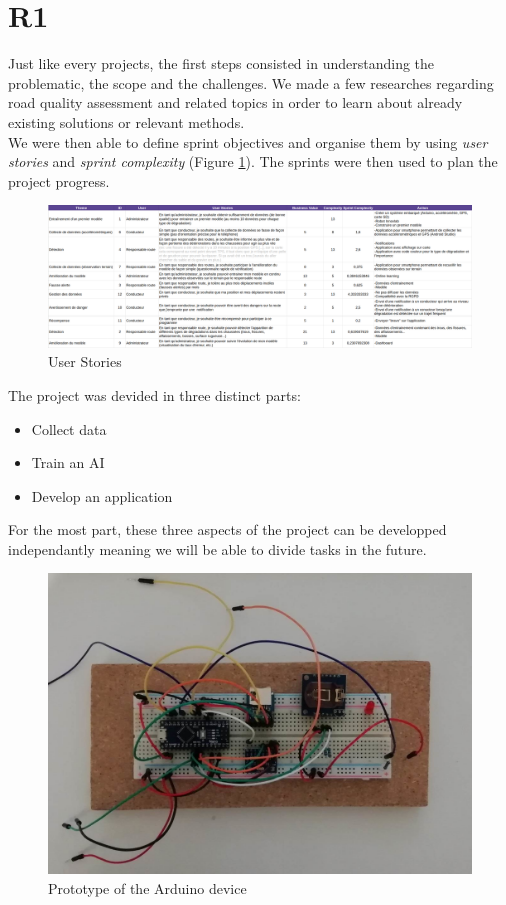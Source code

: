 \section{R1}
Just like every projects, the first steps consisted in understanding the problematic, the scope and the challenges. We made a few researches regarding road quality assessment and related topics in order to learn about already existing solutions or relevant methods.\\

We were then able to define sprint objectives and organise them by using \textit{user stories} and \textit{sprint complexity} (Figure \ref{user_stories}). The sprints were then used to plan the project progress.

\begin{figure}
    \center
    \includegraphics[scale=.2]{img/user_stories.png}
    \caption{User Stories}
    \label{user_stories}
\end{figure}

The project was devided in three distinct parts:
\begin{itemize}
\item Collect data
\item Train an AI
\item Develop an application
\end{itemize}
For the most part, these three aspects of the project can be developped independantly meaning we will be able to divide tasks in the future.\\

\begin{figure}
    \center
    \includegraphics[scale=.8]{img/breadboard.png}
    \caption{Prototype of the Arduino device}
    \label{bread}
\end{figure}

